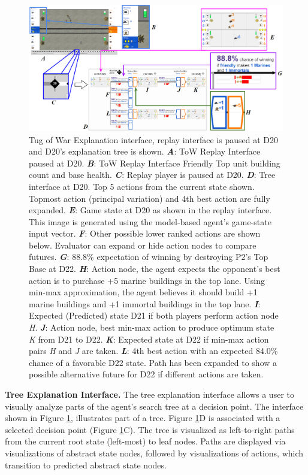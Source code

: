 \documentclass{article}
\begin{document}
\begin{figure}
    \centering
    \includegraphics[scale=0.3]{img/ui/UItoTree.PNG}
    \caption{
    Tug of War Explanation interface, replay interface is paused at D20 and D20's explanation tree is shown.
    \textbf{\textit{A}}: ToW Replay Interface paused at D20.
    \textbf{\textit{B}}: ToW Replay Interface Friendly Top unit building count and base health.
    \textbf{\textit{C}}: Replay player is paused at D20.
    \textbf{\textit{D}}: Tree interface at D20. Top 5 actions from the current state shown. Topmost action (principal variation) and 4th best action are fully expanded.
    \textbf{\textit{E}}: Game state at D20 as shown in the replay interface. This image is generated using the model-based agent's game-state input vector.
    \textbf{\textit{F}}: Other possible lower ranked actions are shown below. Evaluator can expand or hide action nodes to compare futures.
    \textbf{\textit{G}}: 88.8\% expectation of winning by destroying P2's Top Base at D22.
    \textbf{\textit{H}}: Action node, the agent expects the opponent's best action is to purchase +5 marine buildings in the top lane. Using min-max approximation, the agent believes it should build +1 marine buildings and +1 immortal buildings in the top lane.
    \textbf{\textit{I}}: Expected (Predicted) state D21 if both players perform action node \textit{H}.
    \textbf{\textit{J}}: Action node, best min-max action to produce optimum state \textit{K} from D21 to D22. 
    \textbf{\textit{K}}: Expected state at D22 if min-max action pairs \textit{H} and \textit{J} are taken.
    \textbf{\textit{L}}: 4th best action with an expected 84.0\% chance of a favorable D22 state. Path has been expanded to show a possible alternative future for D22 if different actions are taken.
  }
  \label{fig:ToW-ReplayAndExpl}
\end{figure}

{\bf Tree Explanation Interface.} The tree explanation interface allows a user to visually analyze parts of the agent's search tree at a decision point. The interface shown in Figure \ref{fig:ToW-ReplayAndExpl}, illustrates part of a tree. Figure \ref{fig:ToW-ReplayAndExpl}D is associated with a selected decision point (Figure \ref{fig:ToW-ReplayAndExpl}C). The tree is visualized as left-to-right paths from the current root state (left-most) to leaf nodes. Paths are displayed via visualizations of abstract state nodes, followed by visualizations of actions, which transition to predicted abstract state nodes. 
\end{document}
